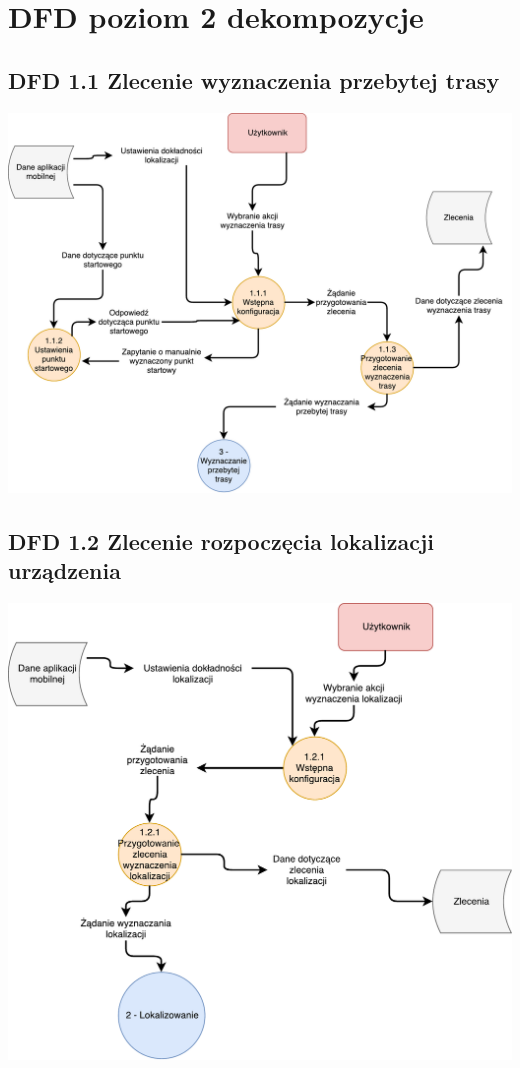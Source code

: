 \documentclass[11pt]{article}
\begin{document}
	\section{DFD poziom 2 dekompozycje}
	\subsection{DFD 1.1 Zlecenie wyznaczenia przebytej trasy }
	\begin{center}
		\includegraphics[scale=0.6]{DFD11.pdf}
	\end{center}
	\subsection{DFD 1.2 Zlecenie rozpoczęcia lokalizacji urządzenia}
	\begin{center}
		\includegraphics[scale=0.7]{DFD12.pdf}
	\end{center}
	\newpage
\end{document}
